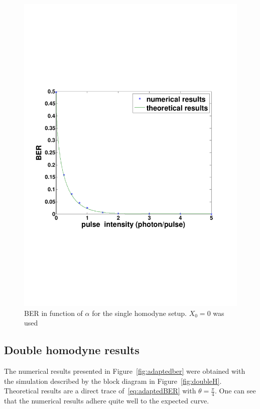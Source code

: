 \documentclass[a4paper]{article}
\begin{document}
\begin{figure}[h]
\centering
\includegraphics[width=\linewidth, trim= 0mm 60mm 0mm 70mm]{directBER.pdf}
\caption{BER in function of $\alpha$ for the single homodyne setup. $X_0=0$ was used}
\label{fig:directber}
\end{figure}

\subsection{Double homodyne results}\label{subsec:DHresults}

The numerical results presented in Figure~\ref{fig:adaptedber} were obtained with the simulation described by the block diagram in Figure~\ref{fig:doubleH}. Theoretical results are a direct trace of~\eqref{eq:adaptedBER} with $\theta=\frac{\pi}{4}$. One can see that the numerical results adhere quite well to the expected curve.
\end{document}

